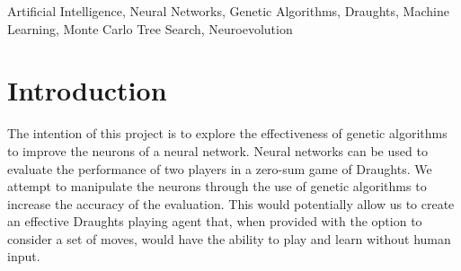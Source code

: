 \documentclass[12pt,a4paper]{article}
\begin{document}
\begin{abstract}
    {\bf Results}


    The system has shown to perform considerably without any training, and has shown to improve over time. However, the system is not necessarily the most efficent of methods. 

    {\bf Conclusion}


    The solution is very appropiate for games that do not involve the use of training data.
    When using genetic algorithms with feed-forward neural networks, it 
    The robustness of the system is quite volatile, and is best paired with mutation methods that are not heavily reliant on entropy.

\end{abstract}
\begin{keywords}
    Artificial Intelligence, Neural Networks, Genetic Algorithms, Draughts, Machine Learning, Monte Carlo Tree Search, Neuroevolution
\end{keywords}
\section{Introduction}
    The intention of this project is to explore the effectiveness of genetic algorithms to improve the neurons of a neural network. Neural networks can be used to evaluate the performance of two players in a zero-sum game of Draughts. We attempt to manipulate the neurons through the use of genetic algorithms to increase the accuracy of the evaluation. This would potentially allow us to create an effective Draughts playing agent that, when provided with the option to consider a set of moves, would have the ability to play and learn without human input.
\end{document}
